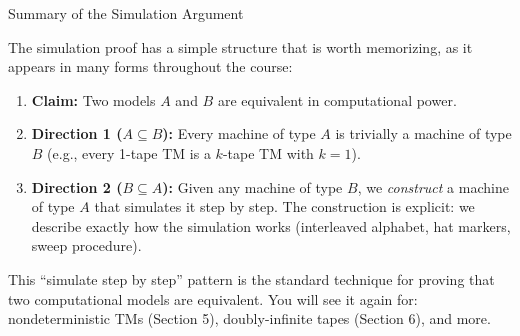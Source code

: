\begin{conceptbox}{Summary of the Simulation Argument}

The simulation proof has a simple structure that is worth memorizing, as it appears in many forms throughout the course:

\begin{enumerate}[nosep]
\item \textbf{Claim:} Two models $A$ and $B$ are equivalent in computational power.
\item \textbf{Direction 1 ($A \subseteq B$):} Every machine of type $A$ is trivially a machine of type $B$ (e.g., every 1-tape TM is a $k$-tape TM with $k = 1$).
\item \textbf{Direction 2 ($B \subseteq A$):} Given any machine of type $B$, we \textit{construct} a machine of type $A$ that simulates it step by step. The construction is explicit: we describe exactly how the simulation works (interleaved alphabet, hat markers, sweep procedure).
\end{enumerate}

This ``simulate step by step'' pattern is the standard technique for proving that two computational models are equivalent. You will see it again for: nondeterministic TMs (Section 5), doubly-infinite tapes (Section 6), and more.

\end{conceptbox}
